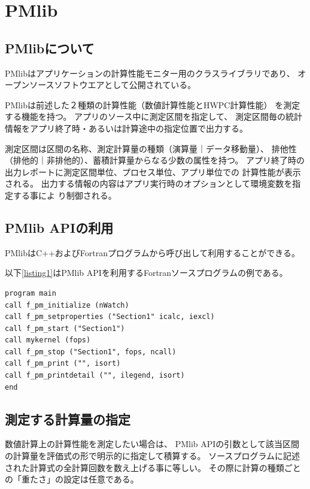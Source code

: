 \documentclass[submit,techrep,noauthor]{ipsj}
\begin{document}
\section{PMlib}

\subsection {PMlibについて}

PMlibはアプリケーションの計算性能モニター用のクラスライブラリであり、
オープンソースソフトウエアとして公開されている。
\cite{PMlib2:webpage} \par
PMlibは前述した２種類の計算性能（数値計算性能とHWPC計算性能）
を測定する機能を持つ。
アプリのソース中に測定区間を指定して、
測定区間毎の統計情報をアプリ終了時・あるいは計算途中の指定位置で出力する。

測定区間は区間の名称、測定計算量の種類（演算量｜データ移動量）、
排他性（排他的｜非排他的）、蓄積計算量からなる少数の属性を持つ。
アプリ終了時の出力レポートに測定区間単位、プロセス単位、アプリ単位での
計算性能が表示される。
出力する情報の内容はアプリ実行時のオプションとして環境変数を指定する事によ
り制御される。


\subsection {PMlib APIの利用}
PMlibはC++およびFortranプログラムから呼び出して利用することができる。

以下\ref{listing1}はPMlib APIを利用するFortranソースプログラムの例である。
\begin{lstlisting}[caption={\hfill},label={listing1},captionpos=t]
program main
call f_pm_initialize (nWatch)
call f_pm_setproperties ("Section1" icalc, iexcl)
call f_pm_start ("Section1")
call mykernel (fops)
call f_pm_stop ("Section1", fops, ncall)
call f_pm_print ("", isort)
call f_pm_printdetail ("", ilegend, isort)
end
\end{lstlisting}


\subsection {測定する計算量の指定}


数値計算上の計算性能を測定したい場合は、
PMlib APIの引数として該当区間の計算量を評価式の形で明示的に指定して積算する。
ソースプログラムに記述された計算式の全計算回数を数え上げる事に等しい。
その際に計算の種類ごとの「重たさ」の設定は任意である。
\end{document}
